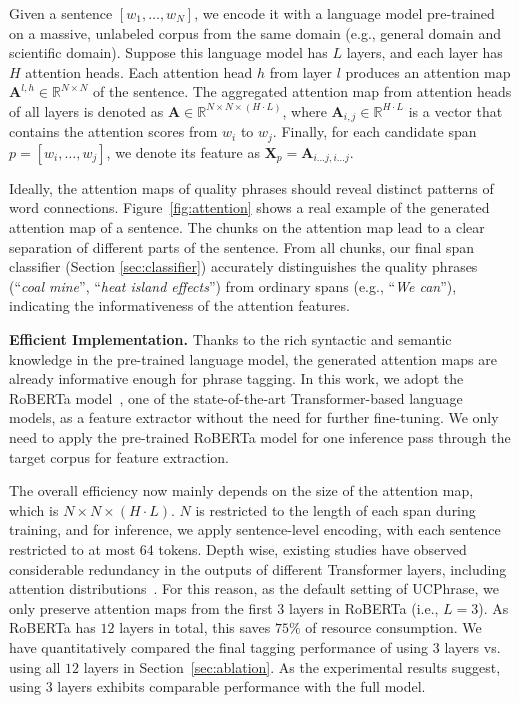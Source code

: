 \documentclass[sigconf]{acmart}
\newcommand{\our}{\mbox{UCPhrase}\xspace}
\newcommand{\eg}{\mbox{e.g.}\xspace}
\newcommand{\example}[1]{``\emph{#1}''}
\newcommand{\tightmath}[1]{\everymath{\medmuskip=1.5mu minus 1.5mu\thickmuskip=2mu minus 2mu}$#1$\everymath{\medmuskip=2mu minus 2mu\thickmuskip=4mu minus 4mu}}
\begin{document}
Given a sentence $[w_1, \ldots, w_N]$, we encode it with a language model pre-trained on a massive, unlabeled corpus from the same domain (\eg, general domain and scientific domain).
Suppose this language model has $L$ layers, and each layer has $H$ attention heads.
Each attention head $h$ from layer $l$ produces an attention map $\mathbf{A}^{l, h} \in \mathbb{R}^{N \times N}$ of the sentence.
The aggregated attention map from attention heads of all layers is denoted as $\mathbf{A} \in \mathbb{R}^{N \times N \times (H \cdot L)}$,
where $\mathbf{A}_{i,j} \in \mathbb{R}^{H \cdot L}$ is a vector that contains the attention scores from $w_i$ to $w_j$. 
Finally, for each candidate span $p = [w_i, \ldots, w_j]$, we denote its feature as $\mathbf{X}_{p} = \mathbf{A}_{i \ldots j, i \ldots j}$.

Ideally, the attention maps of quality phrases should reveal distinct patterns of word connections.
Figure~\ref{fig:attention} shows a real example of the generated attention map of a sentence.
The chunks on the attention map lead to a clear separation of different parts of the sentence.
From all chunks, our final span classifier (Section \ref{sec:classifier}) accurately distinguishes the quality phrases (\example{coal mine}, \example{heat island effects}) from ordinary spans (\eg, \example{We can}), indicating the informativeness of the attention features.


\noindent\textbf{Efficient Implementation.}
Thanks to the rich syntactic and semantic knowledge in the pre-trained language model, the generated attention maps are already informative enough for phrase tagging.
In this work, we adopt the RoBERTa model~\cite{liu2019roberta}, one of the state-of-the-art Transformer-based language models, as a feature extractor without the need for further fine-tuning.
We only need to apply the pre-trained RoBERTa model for one inference pass through the target corpus for feature extraction.

The overall efficiency now mainly depends on the size of the attention map, which is \tightmath{N \times N \times (H \cdot L)}.
$N$ is restricted to the length of each span during training, and for inference, we apply sentence-level encoding, with each sentence restricted to at most 64 tokens.
Depth wise, existing studies have observed considerable redundancy in the outputs of different Transformer layers, including attention distributions~\cite{gong2019efficient,gu2020transformer}.
For this reason, as the default setting of \our, we only preserve attention maps from the first $3$ layers in RoBERTa (i.e., $L = 3$).
As RoBERTa has $12$ layers in total, this saves $75\%$ of resource consumption.
We have quantitatively compared the final tagging performance of using 3 layers vs. using all $12$ layers in Section~\ref{sec:ablation}.
As the experimental results suggest, using 3 layers exhibits comparable performance with the full model.
\end{document}
